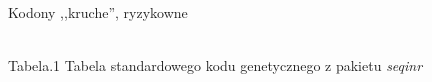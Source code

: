 \documentclass[compress,clock,xcolor=dvipsnames,hyperref={pdfpagelabels=false},final]{beamer}
\begin{document}
\begin{frame}{Kodony ,,kruche'', ryzykowne}
\begin{center}
\\
\small{Tabela.1 Tabela standardowego kodu genetycznego z pakietu {\it seqinr}}
\end{center}
\end{frame}
\end{document}
